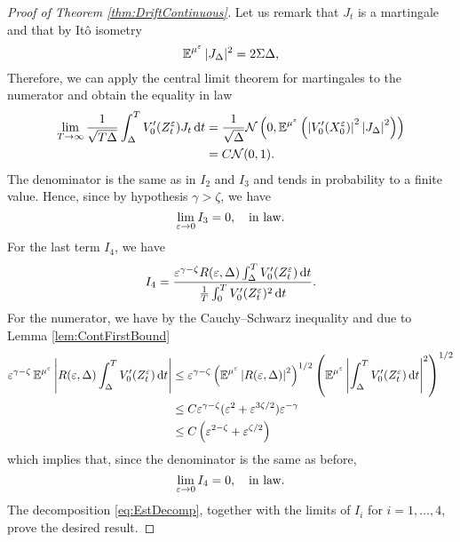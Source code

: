 \documentclass[10pt]{article}
\begin{document}
\begin{proof}[Proof of Theorem \ref{thm:DriftContinuous}]
	Let us remark that $J_t$ is a martingale and that by Itô isometry
	\begin{equation}
		\operatorname{\mathbb{E}}^{\mu^\varepsilon}|J_\Delta|^2 = 2\Sigma\Delta,
	\end{equation}
	Therefore, we can apply the central limit theorem for martingales to the numerator and obtain the equality in law
	\begin{equation}	
	\begin{aligned}
		\lim_{T\to\infty}\frac{1}{\sqrt{T\Delta}}\int_\Delta^T V_0'(Z^\varepsilon_t) J_t \,\mathrm{d} t &= \frac{1}{\sqrt{\Delta}} \mathcal N\left(0,\operatorname{\mathbb{E}}^{\mu^\varepsilon}\left(\left\lvert V_0'(X^\varepsilon_0)\right\rvert^2\left\lvert J_\Delta\right\rvert^2\right)\right) \\
		&= C \mathcal N(0, 1).
	\end{aligned}
	\end{equation}
	The denominator is the same as in $I_2$ and $I_3$ and tends in probability to a finite value. Hence, since by hypothesis $\gamma > \zeta$, we have
	\begin{equation}
		\lim_{\varepsilon \to 0} I_3 = 0, \quad \text{in law}.
	\end{equation}
	For the last term $I_4$, we have
	\begin{equation}
		I_4 = \frac{\varepsilon^{\gamma - \zeta}R(\varepsilon, \Delta)\int_\Delta^T V_0'(Z^\varepsilon_t) \,\mathrm{d} t}{\frac1T\int_0^T V_0'(Z^\varepsilon_t)^2 \,\mathrm{d} t}.
	\end{equation}
	For the numerator, we have by the Cauchy--Schwarz inequality and due to Lemma \ref{lem:ContFirstBound}
	\begin{equation}
	\begin{aligned}
		\varepsilon^{\gamma-\zeta}\operatorname{\mathbb{E}}^{\mu^\varepsilon}\left\lvert R(\varepsilon, \Delta)\int_\Delta^T V_0'(Z^\varepsilon_t) \,\mathrm{d} t\right\rvert &\leq 
		\varepsilon^{\gamma - \zeta} \left(\operatorname{\mathbb{E}}^{\mu^\varepsilon}\left\lvert R(\varepsilon, \Delta)\right\rvert^2\right)^{1/2}\left(\operatorname{\mathbb{E}}^{\mu^\varepsilon}\left\lvert\int_\Delta^T V_0'(Z^\varepsilon_t) \,\mathrm{d} t\right\rvert^2\right)^{1/2}\\
		&\leq C\varepsilon^{\gamma - \zeta}(\varepsilon^2 + \varepsilon^{3\zeta/2}) \varepsilon^{-\gamma}\\
		&\leq C\left(\varepsilon^{2-\zeta} + \varepsilon^{\zeta/2}\right)
	\end{aligned}
	\end{equation}
	which implies that, since the denominator is the same as before,
	\begin{equation}
		\lim_{\varepsilon \to 0} I_4 = 0, \quad \text{in law}.
	\end{equation}
	The decomposition \eqref{eq:EstDecomp}, together with the limits of $I_i$ for $i = 1, \ldots, 4$, prove the desired result.
\end{proof}
\end{document}
